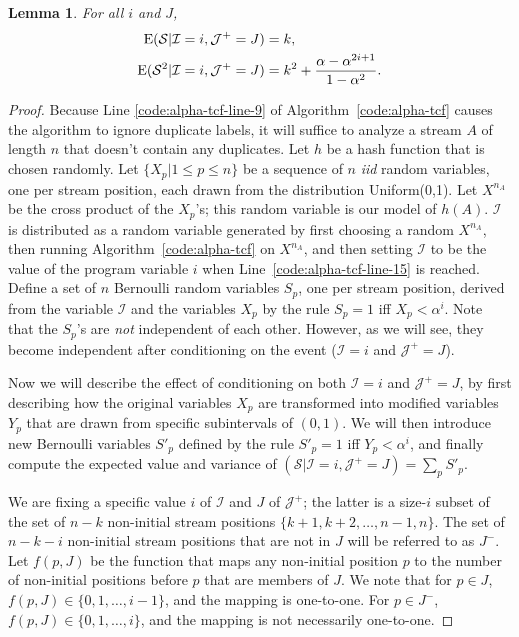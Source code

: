 \documentclass{article}
\newcommand{\ept}{\operatornamewithlimits{E}}
\newtheorem{lemma}[theorem]{Lemma}
\begin{document}
\begin{lemma}\label{space-lemma}
For all $i$ and $J$,
\begin{align}
\ept (\mathcal{S} | \mathcal{I}=i, \mathcal{J}^+=J) = & \; k, \label{space-lemma-line-1} \\
\ept (\mathcal{S}^2 | \mathcal{I}=i, \mathcal{J}^+=J) = & \; k^2 + \frac{\alpha - \alpha^{2i+1}}{1-\alpha^2}.
\end{align}
\end{lemma}
\begin{proof}
Because Line \ref{code:alpha-tcf-line-9} 
of Algorithm~\ref{code:alpha-tcf} causes the algorithm to ignore duplicate labels,
it will suffice to analyze a stream $A$ of length $n$ that doesn't contain any
duplicates.
Let $h$ be a hash function that is
chosen randomly. Let $\{ X_p | 1 \le p \le n \}$ be a sequence of $n$ {\em iid}
random variables, one per stream position, each drawn from the distribution Uniform(0,1). 
Let $X^{n_A}$ be the cross product of the $X_p$'s; this random variable is our model of $h(A)$.
$\mathcal{I}$ is distributed as a random variable generated by first choosing a random $X^{n_A}$, then running Algorithm~\ref{code:alpha-tcf} on $X^{n_A}$,
and then setting $\mathcal{I}$ to be the value of the program variable $i$ when Line~\ref{code:alpha-tcf-line-15} is reached.
Define a set of $n$ Bernoulli random variables $S_p$, one
per stream position, derived from the variable $\mathcal{I}$ and the variables
$X_p$ by the rule $S_p = 1$ iff $X_p < \alpha^i$.
Note that the $S_p$'s are {\em not} independent of each other. However, as we will see, they become 
independent after conditioning on the event ($\mathcal{I}=i$ and $\mathcal{J}^+=J$).

Now we will describe the effect of conditioning on both $\mathcal{I}=i$ and $\mathcal{J}^+=J$,
by first describing how the original variables $X_p$ are transformed
into modified variables $Y_p$ that are drawn from specific
subintervals of $(0,1)$.  We will then introduce new Bernoulli
variables $S'_p$ defined by the rule $S'_p = 1$ iff $Y_p <
\alpha^i$, and finally compute the expected value and variance of
$(\mathcal{S}|\mathcal{I}=i,\mathcal{J}^+=J) = \sum_p S'_p$.


We are fixing a specific value $i$ of $\mathcal{I}$ and $J$ of $\mathcal{J}^+$; the latter is a size-$i$ subset of the set of 
$n-k$ non-initial stream positions $\{k+1, k+2, \ldots, n-1, n\}$.
The set of $n-k-i$ non-initial stream positions that are not in $J$ will be 
referred to as $J^-$.
Let $f(p,J)$ be the function that maps any non-initial position
$p$ to the number of non-initial positions before $p$ that are members of $J$.
We note that for $p \in J$, $f(p,J) \in \{0,1,\ldots,i-1\}$, and the
mapping is one-to-one.
For $p \in J^-$, $f(p,J) \in \{0,1,\ldots,i\}$, and the mapping is not necessarily one-to-one.


\end{proof}
\end{document}
